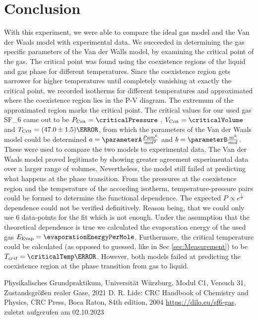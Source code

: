 \documentclass[a4paper,10pt,twocolumn]{article}
\begin{document}
    
    \section[]{Conclusion}\label{sec:conclusion}
    With this experiment, we were able to compare the ideal gas model and the Van der Waals model with experimental data.
    We succeeded in determining the gas specific parameters of the Van der Walls model, by examining the critical point of the gas.
    The critical point was found using the coexistence regions of the liquid and gas phase for different temperatures. 
    Since the coexistence region gets narrower for higher temperatures until completely vanishing at exactly the critical point, we recorded isotherms for different temperatures
    and approximated where the coexistence region lies in the P-V diagram.
    The extremum of the approximated region marks the critical point.
    The critical values for our used gas SF_6\) came out to be $P_{\text{Crit}}=\criticalPressure$ , $V_{\text{Crit}}=\criticalVolume$ and $T_{\text{Crit}}=(47.0\pm 1.5)\degree$, from which the parameters of the Van der Waals model could be determined
    $a=\parameterA \frac{Pa m^6}{mol^2} $ and $b=\parameterB \frac{m^3}{mol} $.
    These were used to compare the two models to experimental data.
    The Van der Waals model proved legitimate by showing greater agreement experimental data over a larger range of volumes.
    Nevertheless, the model still failed at predicting what happens at the phase transition.
    From the pressures at the coexistence region and the temperature of the according isotherm, temperature-pressure pairs could be formed to determine the functional dependence.
    The expected $P \propto e^{\frac{1}{T}} $ dependence could not be verified definitively.
    Reason being, that we could only use 6 data-points for the fit which is not enough.
    Under the assumption that the theoretical dependence is true we calculated the evaporation energy of the used gas $E_{\text{Evap}} =\evaporationEnergyPerMole $.
    Furthermore, the critical temperature could be calculated (as opposed to guessed, like in Sec \ref{sec:Measurement}) to be $T_{crit}=\criticalTemp \degree$.
    However, both models failed at predicting the coexistence region at the phase transition from gas to liquid.
    
    \begin{thebibliography}{}    %
         Physikalisches Grundpraktikum, Universität Würzburg, Modul C1, Versuch 31, Zustandsgrößen realer Gase, 2021
         D. R. Lide: \grqq CRC Handbook of Chemistry
        and Physics\grqq , CRC Press, Boca Raton, 84th
        edition, 2004
         \url{https://dilo.eu/sf6-gas}, zuletzt aufgerufen am 02.10.2023
    \end{thebibliography}
    \clearpage
\end{document}

